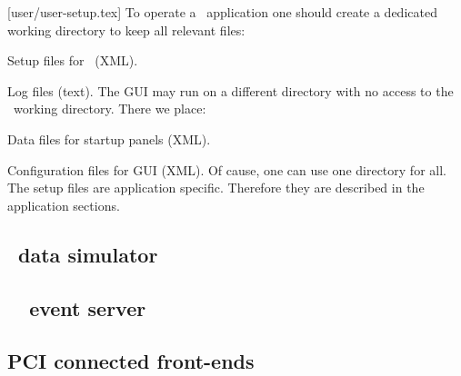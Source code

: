 [user/user-setup.tex]
To operate a \dabc\ application one should create a dedicated 
working directory to keep all relevant files:
\bbul
\item Setup files for \dabc\ (XML).
\item Log files (text).
\ebul
The GUI may run on a different directory with no access to the \dabc\ working directory.
There we place:
\bbul
\item Data files for startup panels (XML).
\item Configuration files for GUI (XML).
\ebul
Of cause, one can use one directory for all.
The setup files are application specific. Therefore they are described in
the application sections.
\subsection[DABC data simulator]{\dabc\ data simulator}
\subsection[DABC MBS event server]{\dabc\ \mbs\ event server}
\subsection{PCI connected front-ends}
